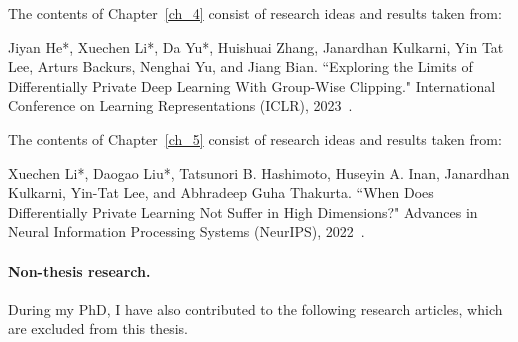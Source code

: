 \noindent The contents of Chapter~\ref{ch_4} consist of research ideas and results taken from:

\begin{mdframed}[leftline=true, topline=false, rightline=false, bottomline=false, linewidth=2pt]
Jiyan He*, Xuechen Li*, Da Yu*, Huishuai Zhang, Janardhan Kulkarni, Yin Tat Lee, Arturs Backurs, Nenghai Yu, and Jiang Bian. ``Exploring the Limits of Differentially Private Deep Learning With Group-Wise Clipping." International Conference on Learning Representations (ICLR), 2023~\cite{he2022exploring}.
\end{mdframed}

\noindent The contents of Chapter~\ref{ch_5} consist of research ideas and results taken from:

\begin{mdframed}[leftline=true, topline=false, rightline=false, bottomline=false, linewidth=2pt]
Xuechen Li*, Daogao Liu*, Tatsunori B. Hashimoto, Huseyin A. Inan, Janardhan Kulkarni, Yin-Tat Lee, and Abhradeep Guha Thakurta. ``When Does Differentially Private Learning Not Suffer in High Dimensions?" Advances in Neural Information Processing Systems (NeurIPS), 2022~\cite{li2022does}.
\end{mdframed}


\newpage
\paragraph{Non-thesis research.}
During my PhD, I have also contributed to the following research articles, which are excluded from this thesis.


